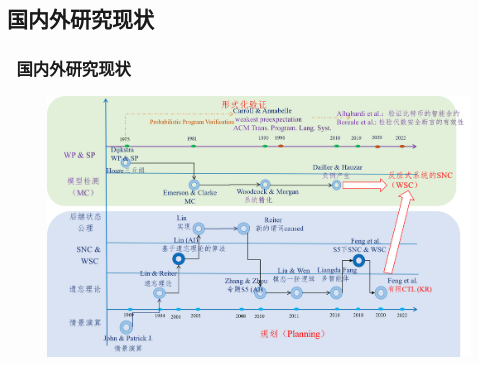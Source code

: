 \documentclass[aspectratio=1610, 9pt, CJK]{beamer}
\begin{document}
	\subsection{国内外研究现状} 
	\begin{frame}
		\frametitle{~国内外研究现状}
		\begin{figure}
			\includegraphics[scale=0.45]{figures/history2}
		\end{figure}
	\end{frame}
\end{document}
